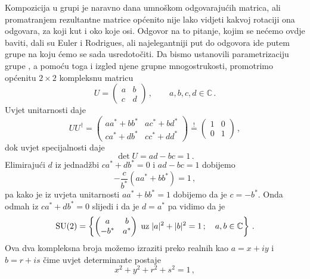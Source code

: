 Kompozicija u grupi  je naravno dana umnoškom odgovarajućih matrica,
ali promatranjem rezultantne matrice općenito nije lako vidjeti kakvoj
rotaciji ona odgovara, za koji kut i oko koje osi. Odgovor na to pitanje,
kojim se nećemo ovdje baviti,
dali su Euler i Rodrigues, ali najelegantniji put do odgovora ide putem
grupe  na koju ćemo se sada usredotočiti.
Da bismo ustanovili parametrizaciju grupe , a pomoću toga i izgled
njene grupne mnogostrukosti, promotrimo općenitu $2 \times 2$ kompleksnu
matricu
\begin{equation}
    U = 
    \begin{pmatrix}
        a & b \\ c & d
    \end{pmatrix} \,, \qquad
    a, b, c, d \in \mathbb{C} \,.
\end{equation}
Uvjet unitarnosti daje
\begin{equation}
    U U^\dagger = \begin{pmatrix}
        aa^*+bb^*  & ac^*+bd^* \\
        ca^*+db^* & c c^* + d d^*
    \end{pmatrix}
    \stackrel{!}{=}
    \begin{pmatrix}
        1 & 0 \\ 0 & 1
    \end{pmatrix} \,,
\end{equation}
dok uvjet specijalnosti daje
\begin{equation}
    \det U = ad - bc = 1 \,.
\end{equation}
Elimirajući $d$ iz jednadžbi $ca^*+db^* =0$ i $ad - bc = 1$ dobijemo
\begin{equation}
    -\frac{c}{b^*}(aa^* + bb^*) = 1 \,,
\end{equation}
pa kako je iz uvjeta unitarnosti $aa^* + bb^* = 1$ dobijemo da je $c=-b^*$.
Onda odmah iz $ca^*+db^* =0$ slijedi i da je $d = a^*$ pa vidimo da je
\begin{equation}
    \mathrm{SU}(2) = \left\{
        \begin{pmatrix}
            a & b \\ -b^* & a^*
    \end{pmatrix} \; \text{uz}\;   |a|^2 + |b|^2 = 1\,;\quad  a,b \in\mathbb{C} \right\} \,.
    \label{eq:su2ab}
\end{equation}
Ova dva kompleksna broja možemo izraziti preko realnih kao $a = x + iy$ i
$b = r + is$ čime uvjet determinante postaje
\begin{equation}
    x^2 + y^2 +r^2 +s^2 = 1 \,,
    \label{eq:s3sfera}
\end{equation}

